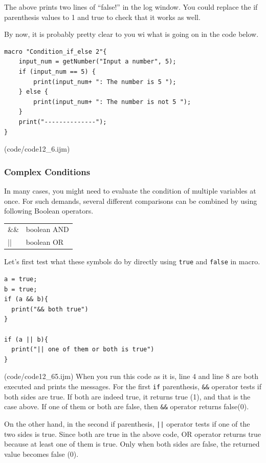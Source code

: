\documentclass[11pt,a4paper,oneside]{report}
\newenvironment{indentCom}
{\begin{list}{}
         {\setlength{\leftmargin}{1em}}
         \item[]
}
{\end{list}}
\newcommand{\ilcom}[1]{\texttt{\small#1}}
\begin{document}
The above prints two lines of ``false!'' in the log window. You could replace
the if parenthesis values to 1 and true to check that it works as well. 

By now, it is probably pretty clear to you wi what is going on in the code below. 

\begin{lstlisting}[morekeywords={*, if, else}]
macro "Condition_if_else 2"{
	input_num = getNumber("Input a number", 5);
	if (input_num == 5) {
		print(input_num+ ": The number is 5 ");
	} else {
		print(input_num+ ": The number is not 5 ");
	}
	print("--------------");
}

\end{lstlisting}
(code/code12_6.ijm)

\subsubsection{Complex Conditions}
In many cases, you might need to evaluate the condition of multiple variables at once. 
For such demands, several different comparisons can be combined by using following Boolean operators. 

\begin{indentCom}
 \begin{tabular*}{0.5\textwidth}{ l l }
\&\& & boolean AND\\
|| & boolean OR\\
\end{tabular*}
\end{indentCom}

Let's first test what these symbols do by directly using
\ilcom{true} and \ilcom{false} in macro.

\begin{lstlisting}[morekeywords={*, if, else}]
a = true;
b = true;
if (a && b){
  print("&& both true")
}

if (a || b){
  print("|| one of them or both is true")
}

\end{lstlisting}
(code/code12_65.ijm)
When you run this code as it is, line 4 and line 8 are both executed and prints
the messages. For the first \ilcom{if} parenthesis, \ilcom{\&\&} operator tests if
both sides are true. If both are indeed true, it returns true (1), and that is
the case above. If one of them or both are false, then \ilcom{\&\&}
operator returns false(0). 

On the other hand, in the second if parenthesis,
\ilcom{||} operator tests if one of the two sides is true. Since both are
true in the above code, OR operator returns true because at least one of them is
true. Only when both sides are false, the returned value becomes false (0).
\end{document}
